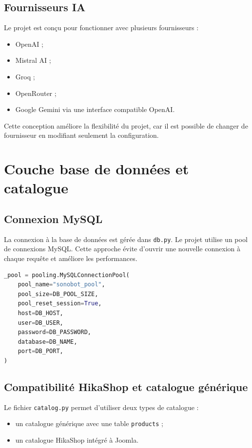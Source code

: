 \documentclass[12pt,a4paper]{report}
\begin{document}
\section{Fournisseurs IA}

Le projet est conçu pour fonctionner avec plusieurs fournisseurs :

\begin{itemize}
    \item OpenAI ;
    \item Mistral AI ;
    \item Groq ;
    \item OpenRouter ;
    \item Google Gemini via une interface compatible OpenAI.
\end{itemize}

Cette conception améliore la flexibilité du projet, car il est possible de changer de fournisseur en modifiant seulement la configuration.

\chapter{Couche base de données et catalogue}

\section{Connexion MySQL}

La connexion à la base de données est gérée dans \texttt{db.py}. Le projet utilise un pool de connexions MySQL. Cette approche évite d'ouvrir une nouvelle connexion à chaque requête et améliore les performances.

\begin{lstlisting}[language=Python,caption={Principe du pool de connexions MySQL}]
_pool = pooling.MySQLConnectionPool(
    pool_name="sonobot_pool",
    pool_size=DB_POOL_SIZE,
    pool_reset_session=True,
    host=DB_HOST,
    user=DB_USER,
    password=DB_PASSWORD,
    database=DB_NAME,
    port=DB_PORT,
)
\end{lstlisting}

\section{Compatibilité HikaShop et catalogue générique}

Le fichier \texttt{catalog.py} permet d'utiliser deux types de catalogue :

\begin{itemize}
    \item un catalogue générique avec une table \texttt{products} ;
    \item un catalogue HikaShop intégré à Joomla.
\end{itemize}
\end{document}
